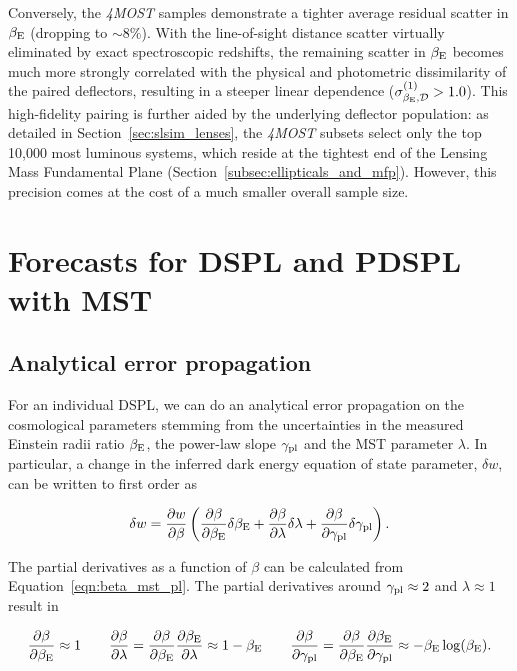 \documentclass[a4paper,11pt]{article}
\begin{document}
Conversely, the \textit{4MOST} samples demonstrate a tighter average residual scatter in $\beta_{\rm E}$ (dropping to $\sim 8\%$). With the line-of-sight distance scatter virtually eliminated by exact spectroscopic redshifts, the remaining scatter in $\beta_{\rm E}$ becomes much more strongly correlated with the physical and photometric dissimilarity of the paired deflectors, resulting in a steeper linear dependence ($\sigma_{\beta_{\rm E},\rm \mathcal{D}}^{(1)} > 1.0$). This high-fidelity pairing is further aided by the underlying deflector population: as detailed in Section~\ref{sec:slsim_lenses}, the \textit{4MOST} subsets select only the top 10,000 most luminous systems, which reside at the tightest end of the Lensing Mass Fundamental Plane (Section~\ref{subsec:ellipticals_and_mfp}). However, this precision comes at the cost of a much smaller overall sample size.

\section{Forecasts for DSPL and PDSPL with MST}\label{sec:forecast}

\subsection{Analytical error propagation}
For an individual DSPL, we can do an analytical error propagation on the cosmological parameters stemming from the uncertainties in the measured Einstein radii ratio $\beta_{\rm E}$, the power-law slope $\gamma_{\rm pl}$ and the MST parameter $\lambda$. In particular, a change in the inferred dark energy equation of state parameter, $\delta w$, can be written to first order as

\begin{equation}
    \delta w =  \frac{\partial w}{\partial \beta} \left( \frac{\partial \beta}{\partial \beta_{\rm E}} \delta \beta_{\rm E} + \frac{\partial \beta}{\partial \lambda} \delta \lambda + \frac{\partial \beta}{\partial \gamma_{\rm pl}} \delta \gamma_{\rm pl} \right).
\end{equation}

The partial derivatives as a function of $\beta$ can be calculated from Equation~\ref{eqn:beta_mst_pl}. The partial derivatives around $\gamma_{\rm pl} \approx 2$ and $\lambda \approx 1$ result in

\begin{equation}
    \frac{\partial \beta}{\partial \beta_{\rm E}} \approx 1 \qquad
    \frac{\partial \beta}{\partial \lambda} = \frac{\partial \beta}{\partial \beta_{\rm E}}\frac{\partial \beta_{\rm E}}{\partial \lambda}\approx 1 - \beta_{\rm E} \qquad
    \frac{\partial \beta}{\partial \gamma_{\rm pl}} =\frac{\partial \beta}{\partial \beta_{\rm E}}\frac{\partial \beta_{\rm E}}{\partial \gamma_{\rm pl}} \approx -\beta_{\rm E} \log(\beta_{\rm E}).
\end{equation}
\end{document}
